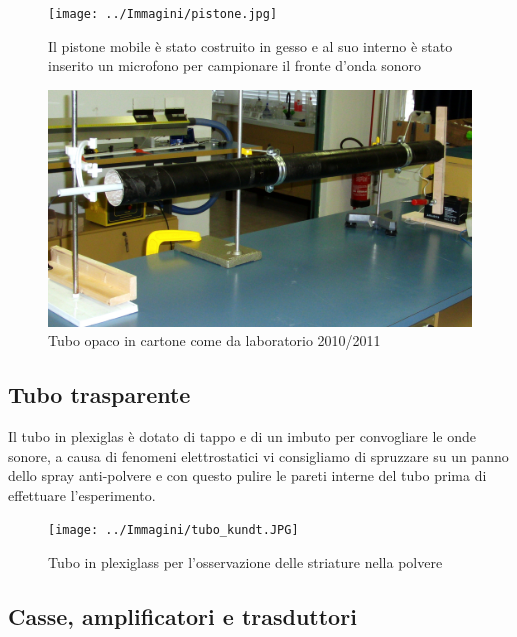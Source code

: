 \documentclass[a4paper,10pt,oneside]{article}
\begin{document}
\begin{figure}[H]
 \centering
 \texttt{[image: ../Immagini/pistone.jpg]}
 \caption{Il pistone mobile è stato costruito in gesso e al suo interno è stato inserito un microfono per campionare il fronte d'onda sonoro}
 \label{fig:pistone}
\end{figure}


\begin{figure}[H]
 \centering
 \includegraphics[width=\textwidth]{../Immagini/tubo_nero.JPG}
 \caption{Tubo opaco in cartone come da laboratorio 2010/2011}
 \label{fig:tubi_cartone}
\end{figure}


\subsection*{Tubo trasparente}

Il tubo in plexiglas è dotato di tappo e di un imbuto per convogliare le onde sonore, a causa di fenomeni elettrostatici vi consigliamo di spruzzare su un panno dello spray anti-polvere e con questo pulire le pareti interne del tubo prima di effettuare l'esperimento.



\begin{figure}[H]
 \centering
 \texttt{[image: ../Immagini/tubo\_kundt.JPG]}
 \caption{Tubo in plexiglass per l'osservazione delle striature nella polvere}
 \label{fig:tubo_plexiglass}
\end{figure}


\subsection*{Casse, amplificatori e trasduttori}
\end{document}
